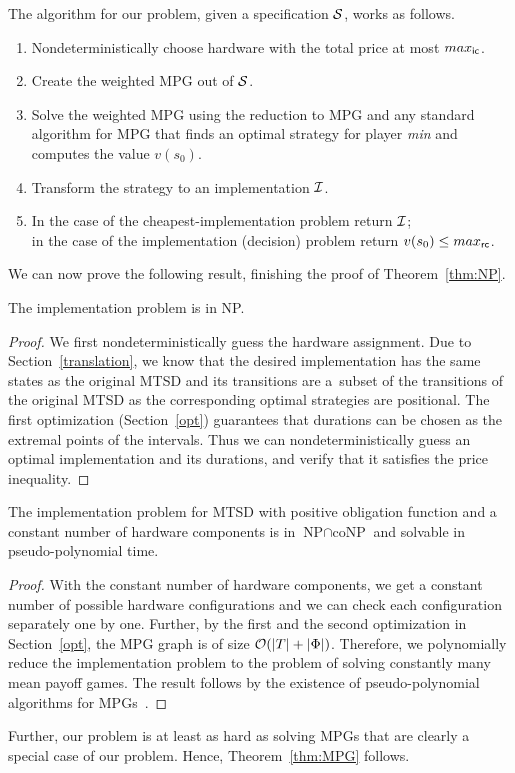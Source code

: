 The algorithm for our problem, given a specification $\mathcal S$, works as follows.
\begin{enumerate}
\item Nondeterministically choose hardware with the total price at most $max_{\mathsf{ic}}$.
\item Create the weighted MPG out of $\mathcal S$.
\item Solve the weighted MPG using the reduction to MPG and any standard
algorithm for MPG that finds an optimal strategy for player \emph{min} and
computes the value $v(s_0)$.
\item Transform the strategy to an implementation $\mathcal I$.
\item In the case of the cheapest-implementation problem return $\mathcal I$;\\ in
the case of the implementation (decision) problem return $v(s_0)\leq max_{\mathsf{rc}}$. 
\end{enumerate}
We can now prove the following result, finishing the proof
of Theorem~\ref{thm:NP}.

\begin{proposition}
The implementation problem is in NP.
\end{proposition}
\begin{proof}
We first nondeterministically guess the hardware assignment.
Due to \linebreak Section~\ref{translation}, we know that 
the desired implementation has the same
states as the original MTSD and its transitions are a~subset of the transitions
of the original MTSD as the corresponding optimal strategies are positional.
The first optimization (Section~\ref{opt}) guarantees that 
durations can be chosen as the extremal points of the intervals. 
Thus we can nondeterministically guess an optimal implementation 
and its durations,
and verify that it satisfies the price inequality.
\end{proof}

\begin{proposition}
The implementation problem for MTSD with %
positive obligation function and 
a constant number of hardware components
is in $\text{NP} \cap \text{coNP}$ 
and solvable in pseudo-polynomial time.
\end{proposition}
\begin{proof}
With the constant number of hardware components,
we get a constant number of possible hardware configurations and 
we can check each configuration separately one by one. 
Further, by the first and the second optimization in Section~\ref{opt}, 
the MPG graph is of size $\mathcal O(|T|+|\Phi|)$. Therefore, we polynomially reduce the implementation problem to the problem of solving constantly many 
mean payoff games. The result follows by the existence of pseudo-polynomial 
algorithms for MPGs~\cite{Zwick96thecomplexity}.
\end{proof}

Further, our problem is at least as hard as solving MPGs that are clearly 
a special case of our problem. Hence, Theorem~\ref{thm:MPG} follows.

